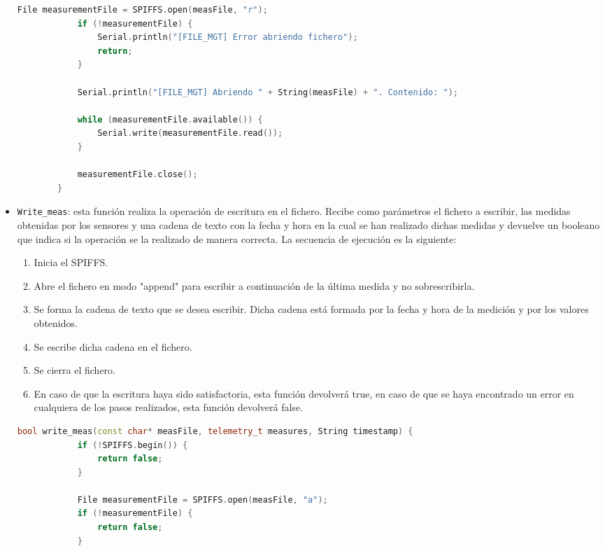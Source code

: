 \begin{itemize}
\begin{lstlisting}[captionpos=b, caption={Funcion \texttt{Read\_file}}, language=c++]
            File measurementFile = SPIFFS.open(measFile, "r");
            if (!measurementFile) {
                Serial.println("[FILE_MGT] Error abriendo fichero");
                return;
            }

            Serial.println("[FILE_MGT] Abriendo " + String(measFile) + ". Contenido: ");

            while (measurementFile.available()) {
                Serial.write(measurementFile.read());
            }

            measurementFile.close();
        }
    \end{lstlisting}
    \item \texttt{Write\_meas}: esta función realiza la operación de escritura en el fichero. Recibe como parámetros el fichero a escribir, las medidas obtenidas por los sensores y una cadena de texto con la fecha y hora en la cual se han realizado dichas medidas y devuelve un  booleano que indica si la operación se la realizado de manera correcta. La secuencia de ejecución es la siguiente:
    \begin{enumerate}
        \item Inicia el SPIFFS.
        \item Abre el fichero en modo "append" para escribir a continuación de la última medida y no sobrescribirla.
        \item Se forma la cadena de texto que se desea escribir. Dicha cadena está formada por la fecha y hora de la medición y por los valores obtenidos.
        \item Se escribe dicha cadena en el fichero.
        \item Se cierra el fichero.
        \item En caso de que la escritura haya sido satisfactoria, esta función devolverá true, en caso de que se haya encontrado un error en cualquiera de los pasos realizados, esta función devolverá false.
    \end{enumerate}
    \begin{lstlisting}[captionpos=b, caption={Funcion \texttt{Write\_file}}, language=c++]
        bool write_meas(const char* measFile, telemetry_t measures, String timestamp) {
            if (!SPIFFS.begin()) {
                return false;
            }

            File measurementFile = SPIFFS.open(measFile, "a");
            if (!measurementFile) {
                return false;
            }


\end{lstlisting}
\end{itemize}
